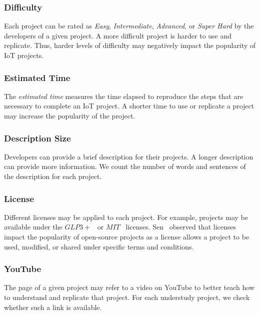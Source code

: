\subsubsection*{Difficulty} Each project can be rated as \textit{Easy}, \textit{Intermediate}, \textit{Advanced}, or \textit{Super Hard} by the developers of a given project.
A more difficult project is harder to use and replicate. Thus, harder levels of difficulty may negatively impact the popularity of IoT projects.

\subsubsection*{Estimated Time} The {\em estimated time} measures the time
elapsed to reproduce the steps that are necessary to complete an IoT project.
A shorter time to use or replicate a project may increase the popularity of the
project.

\subsubsection*{Description Size} Developers can provide a brief description for their projects. A longer description can provide more information. We count the number of words and sentences of the description for each project.

\subsubsection*{License} Different licenses may be applied to each project.
For example, projects may be available under the $GLP3+$~\cite{gpllicense} or $MIT$~\cite{open2006license} licenses.
Sen~\cite{sen2006open} observed that licenses impact the popularity of open-source projects as a license allows a project to be used, modified, or shared under specific terms and conditions.

\subsubsection*{YouTube} The page of a given project may refer to a video on YouTube to better teach how to understand and replicate that project. For each understudy project, we check whether such a link is available.

